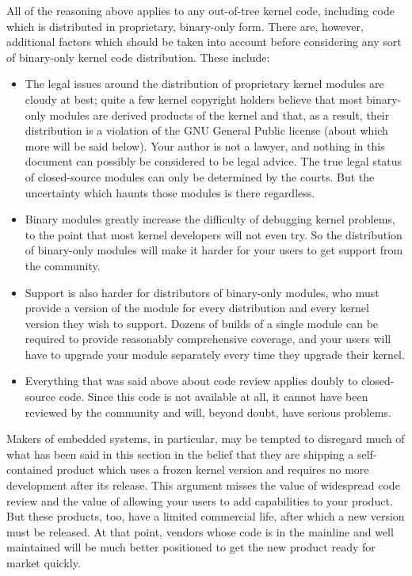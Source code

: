 \documentclass[a4paper,8pt,english]{sphinxmanual}
\begin{document}
All of the reasoning above applies to any out-of-tree kernel code,
including code which is distributed in proprietary, binary-only form.
There are, however, additional factors which should be taken into account
before considering any sort of binary-only kernel code distribution.  These
include:
\begin{itemize}
\item {} 
The legal issues around the distribution of proprietary kernel modules
are cloudy at best; quite a few kernel copyright holders believe that
most binary-only modules are derived products of the kernel and that, as
a result, their distribution is a violation of the GNU General Public
license (about which more will be said below).  Your author is not a
lawyer, and nothing in this document can possibly be considered to be
legal advice.  The true legal status of closed-source modules can only be
determined by the courts.  But the uncertainty which haunts those modules
is there regardless.

\item {} 
Binary modules greatly increase the difficulty of debugging kernel
problems, to the point that most kernel developers will not even try.  So
the distribution of binary-only modules will make it harder for your
users to get support from the community.

\item {} 
Support is also harder for distributors of binary-only modules, who must
provide a version of the module for every distribution and every kernel
version they wish to support.  Dozens of builds of a single module can
be required to provide reasonably comprehensive coverage, and your users
will have to upgrade your module separately every time they upgrade their
kernel.

\item {} 
Everything that was said above about code review applies doubly to
closed-source code.  Since this code is not available at all, it cannot
have been reviewed by the community and will, beyond doubt, have serious
problems.

\end{itemize}

Makers of embedded systems, in particular, may be tempted to disregard much
of what has been said in this section in the belief that they are shipping
a self-contained product which uses a frozen kernel version and requires no
more development after its release.  This argument misses the value of
widespread code review and the value of allowing your users to add
capabilities to your product.  But these products, too, have a limited
commercial life, after which a new version must be released.  At that
point, vendors whose code is in the mainline and well maintained will be
much better positioned to get the new product ready for market quickly.
\end{document}
